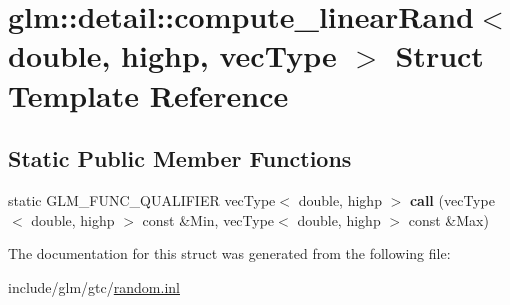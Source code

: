 \hypertarget{structglm_1_1detail_1_1compute__linearRand_3_01double_00_01highp_00_01vecType_01_4}{}\section{glm\+:\+:detail\+:\+:compute\+\_\+linear\+Rand$<$ double, highp, vec\+Type $>$ Struct Template Reference}
\label{structglm_1_1detail_1_1compute__linearRand_3_01double_00_01highp_00_01vecType_01_4}
\subsection*{Static Public Member Functions}
\begin{DoxyCompactItemize}
\item 
\mbox{\label{structglm_1_1detail_1_1compute__linearRand_3_01double_00_01highp_00_01vecType_01_4_a2b6945aa0c510d768365896126a5017a}} 
static G\+L\+M\+\_\+\+F\+U\+N\+C\+\_\+\+Q\+U\+A\+L\+I\+F\+I\+ER vec\+Type$<$ double, highp $>$ {\bfseries call} (vec\+Type$<$ double, highp $>$ const \&Min, vec\+Type$<$ double, highp $>$ const \&Max)
\end{DoxyCompactItemize}


The documentation for this struct was generated from the following file\+:\begin{DoxyCompactItemize}
\item 
include/glm/gtc/\hyperlink{random_8inl}{random.\+inl}\end{DoxyCompactItemize}
